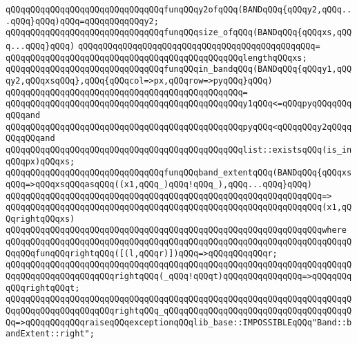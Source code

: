 \verb|qQQqqQQqqQQqqQQqqQQqqQQqqQQqqQQqfunqQQqy2ofqQQq(BANDqQQq{qQQqy2,qQQq...qQQq}qQQq)qQQq=qQQqqQQqqQQqy2;|\newline
\newline
\verb|qQQqqQQqqQQqqQQqqQQqqQQqqQQqqQQqfunqQQqsize_ofqQQq(BANDqQQq{qQQqxs,qQQq...qQQq}qQQq)|\newline
\verb|qQQqqQQqqQQqqQQqqQQqqQQqqQQqqQQqqQQqqQQqqQQqqQQq=|\newline
\verb|qQQqqQQqqQQqqQQqqQQqqQQqqQQqqQQqqQQqqQQqqQQqqQQqlengthqQQqxs;|\newline
\newline
\verb|qQQqqQQqqQQqqQQqqQQqqQQqqQQqqQQqfunqQQqin_bandqQQq(BANDqQQq{qQQqy1,qQQqy2,qQQqxsqQQq},qQQq{qQQqcol=>px,qQQqrow=>pyqQQq}qQQq)|\newline
\verb|qQQqqQQqqQQqqQQqqQQqqQQqqQQqqQQqqQQqqQQqqQQqqQQq=|\newline
\verb|qQQqqQQqqQQqqQQqqQQqqQQqqQQqqQQqqQQqqQQqqQQqqQQqy1qQQq<=qQQqpyqQQqqQQqqQQqand|\newline
\verb|qQQqqQQqqQQqqQQqqQQqqQQqqQQqqQQqqQQqqQQqqQQqqQQqpyqQQq<qQQqqQQqy2qQQqqQQqqQQqand|\newline
\verb|qQQqqQQqqQQqqQQqqQQqqQQqqQQqqQQqqQQqqQQqqQQqqQQqlist::existsqQQq(is_inqQQqpx)qQQqxs;|\newline
\newline
\verb|qQQqqQQqqQQqqQQqqQQqqQQqqQQqqQQqfunqQQqband_extentqQQq(BANDqQQq{qQQqxsqQQq=>qQQqxsqQQqasqQQq((x1,qQQq_)qQQq!qQQq_),qQQq...qQQq}qQQq)|\newline
\verb|qQQqqQQqqQQqqQQqqQQqqQQqqQQqqQQqqQQqqQQqqQQqqQQqqQQqqQQqqQQqqQQq=>|\newline
\verb|qQQqqQQqqQQqqQQqqQQqqQQqqQQqqQQqqQQqqQQqqQQqqQQqqQQqqQQqqQQqqQQq(x1,qQQqrightqQQqxs)|\newline
\verb|qQQqqQQqqQQqqQQqqQQqqQQqqQQqqQQqqQQqqQQqqQQqqQQqqQQqqQQqqQQqqQQqwhere|\newline
\newline
\verb|qQQqqQQqqQQqqQQqqQQqqQQqqQQqqQQqqQQqqQQqqQQqqQQqqQQqqQQqqQQqqQQqqQQqqQQqqQQqfunqQQqrightqQQq([(l,qQQqr)])qQQq=>qQQqqQQqqQQqr;|\newline
\verb|qQQqqQQqqQQqqQQqqQQqqQQqqQQqqQQqqQQqqQQqqQQqqQQqqQQqqQQqqQQqqQQqqQQqqQQqqQQqqQQqqQQqqQQqqQQqrightqQQq(_qQQq!qQQqt)qQQqqQQqqQQqqQQq=>qQQqqQQqqQQqrightqQQqt;|\newline
\verb|qQQqqQQqqQQqqQQqqQQqqQQqqQQqqQQqqQQqqQQqqQQqqQQqqQQqqQQqqQQqqQQqqQQqqQQqqQQqqQQqqQQqqQQqqQQqrightqQQq_qQQqqQQqqQQqqQQqqQQqqQQqqQQqqQQqqQQqqQQq=>qQQqqQQqqQQqraiseqQQqexceptionqQQqlib_base::IMPOSSIBLEqQQq"Band::bandExtent::right";|\newline
